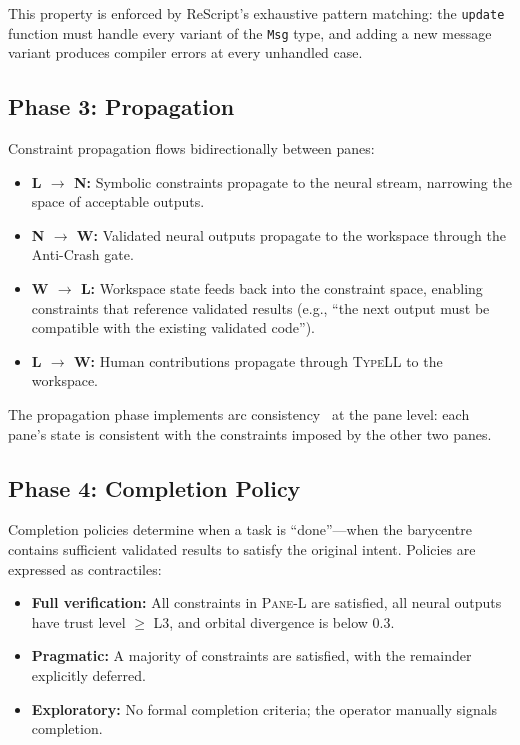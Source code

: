 \documentclass[11pt,a4paper]{article}
\newcommand{\paneL}{\textsc{Pane-L}}
\newcommand{\typell}{\textsc{TypeLL}}
\begin{document}
This property is enforced by ReScript's exhaustive pattern matching:
the \texttt{update} function must handle every variant of the
\texttt{Msg} type, and adding a new message variant produces compiler
errors at every unhandled case.

\subsection{Phase 3: Propagation}

Constraint propagation flows bidirectionally between panes:

\begin{itemize}
  \item \textbf{L $\to$ N:} Symbolic constraints propagate to the
    neural stream, narrowing the space of acceptable outputs.
  \item \textbf{N $\to$ W:} Validated neural outputs propagate to
    the workspace through the Anti-Crash gate.
  \item \textbf{W $\to$ L:} Workspace state feeds back into the
    constraint space, enabling constraints that reference validated
    results (e.g., ``the next output must be compatible with the
    existing validated code'').
  \item \textbf{L $\to$ W:} Human contributions propagate through
    \typell{} to the workspace.
\end{itemize}

The propagation phase implements arc consistency~\citep{mackworth1977consistency}
at the pane level: each pane's state is consistent with the
constraints imposed by the other two panes.

\subsection{Phase 4: Completion Policy}

Completion policies determine when a task is ``done''---when the
barycentre contains sufficient validated results to satisfy the
original intent. Policies are expressed as contractiles:

\begin{itemize}
  \item \textbf{Full verification:} All constraints in \paneL{} are
    satisfied, all neural outputs have trust level $\geq$ L3, and
    orbital divergence is below 0.3.
  \item \textbf{Pragmatic:} A majority of constraints are satisfied,
    with the remainder explicitly deferred.
  \item \textbf{Exploratory:} No formal completion criteria; the
    operator manually signals completion.
\end{itemize}
\end{document}
